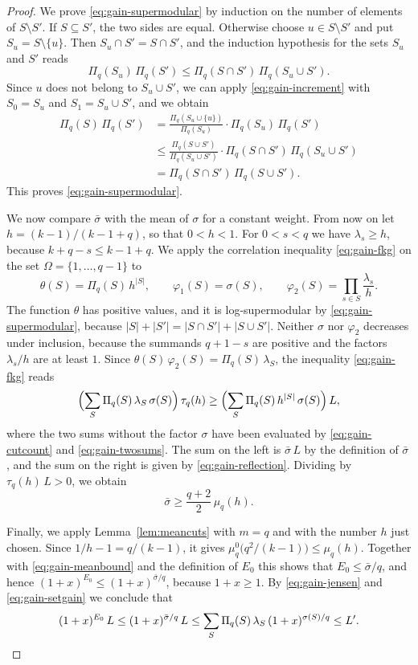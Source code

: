 \documentclass{amsart}
\theoremstyle{definition}
\theoremstyle{remark}
\numberwithin{equation}{section}
\begin{document}
\begin{proof}
We prove \eqref{eq:gain-supermodular} by induction on the number of elements
of $S\setminus S'$. If $S\subseteq S'$, the two sides are equal. Otherwise
choose $u\in S\setminus S'$ and put $S_u=S\setminus\{u\}$. Then
$S_u\cap S'=S\cap S'$, and the induction hypothesis for the sets $S_u$ and
$S'$ reads
\[
\Pi_q(S_u)\,\Pi_q(S')\le\Pi_q(S\cap S')\,\Pi_q(S_u\cup S').
\]
Since $u$ does not belong to $S_u\cup S'$, we can apply
\eqref{eq:gain-increment} with $S_0=S_u$ and $S_1=S_u\cup S'$, and we obtain
\begin{align*}
\Pi_q(S)\,\Pi_q(S')
&=\frac{\Pi_q(S_u\cup\{u\})}{\Pi_q(S_u)}\cdot\Pi_q(S_u)\,\Pi_q(S')\\
&\le\frac{\Pi_q(S\cup S')}{\Pi_q(S_u\cup S')}\cdot
\Pi_q(S\cap S')\,\Pi_q(S_u\cup S')\\
&=\Pi_q(S\cap S')\,\Pi_q(S\cup S').
\end{align*}
This proves \eqref{eq:gain-supermodular}.

We now compare $\bar\sigma$ with the mean of $\sigma$ for a constant weight.
From now on let $h=(k-1)/(k-1+q)$, so that $0<h<1$. For $0<s<q$ we have
$\lambda_s\ge h$, because $k+q-s\le k-1+q$. We apply the correlation
inequality \eqref{eq:gain-fkg} on the set $\Omega=\{1,\dots,q-1\}$ to
\[
\theta(S)=\Pi_q(S)\,h^{|S|},\qquad\varphi_1(S)=\sigma(S),\qquad
\varphi_2(S)=\prod_{s\in S}\frac{\lambda_s}{h}.
\]
The function $\theta$ has positive values, and it is log-supermodular by
\eqref{eq:gain-supermodular}, because $|S|+|S'|=|S\cap S'|+|S\cup S'|$.
Neither $\sigma$ nor $\varphi_2$
decreases under inclusion, because the summands $q+1-s$ are positive and the
factors $\lambda_s/h$ are at least $1$. Since
$\theta(S)\,\varphi_2(S)=\Pi_q(S)\,\lambda_S$, the
inequality \eqref{eq:gain-fkg} reads
\[
\Bigl(\sum_{S}\Pi_q(S)\,\lambda_S\,\sigma(S)\Bigr)\,\tau_q(h)
\ge\Bigl(\sum_{S}\Pi_q(S)\,h^{|S|}\,\sigma(S)\Bigr)\,L,
\]
where the two sums without the factor $\sigma$ have been evaluated by
\eqref{eq:gain-cutcount} and \eqref{eq:gain-twosums}. The sum on the left is
$\bar\sigma\,L$ by the definition of $\bar\sigma$, and the sum on the right
is given by \eqref{eq:gain-reflection}. Dividing by $\tau_q(h)\,L>0$, we
obtain
\begin{equation}\label{eq:gain-meanbound}
\bar\sigma\ge\frac{q+2}{2}\,\mu_q(h).
\end{equation}

Finally, we apply Lemma~\ref{lem:meancuts} with $m=q$ and with the number
$h$ just chosen. Since $1/h-1=q/(k-1)$, it gives
$\mu^0_q\bigl(q^2/(k-1)\bigr)\le\mu_q(h)$. Together with
\eqref{eq:gain-meanbound} and the definition of $E_0$ this shows that
$E_0\le\bar\sigma/q$, and hence $(1+x)^{E_0}\le(1+x)^{\bar\sigma/q}$, because
$1+x\ge1$. By \eqref{eq:gain-jensen} and \eqref{eq:gain-setgain} we conclude
that
\[
(1+x)^{E_0}\,L\le(1+x)^{\bar\sigma/q}\,L
\le\sum_{S}\Pi_q(S)\,\lambda_S\,(1+x)^{\sigma(S)/q}\le L'.\qedhere
\]
\end{proof}
\end{document}
